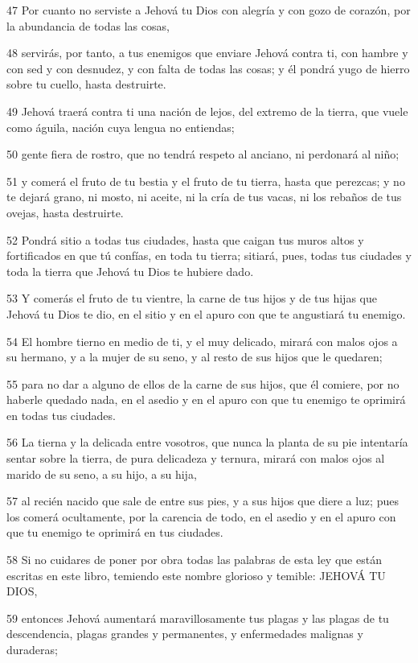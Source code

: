 \par 47 Por cuanto no serviste a Jehová tu Dios con alegría y con gozo de corazón, por la abundancia de todas las cosas,
\par 48 servirás, por tanto, a tus enemigos que enviare Jehová contra ti, con hambre y con sed y con desnudez, y con falta de todas las cosas; y él pondrá yugo de hierro sobre tu cuello, hasta destruirte.
\par 49 Jehová traerá contra ti una nación de lejos, del extremo de la tierra, que vuele como águila, nación cuya lengua no entiendas;
\par 50 gente fiera de rostro, que no tendrá respeto al anciano, ni perdonará al niño;
\par 51 y comerá el fruto de tu bestia y el fruto de tu tierra, hasta que perezcas; y no te dejará grano, ni mosto, ni aceite, ni la cría de tus vacas, ni los rebaños de tus ovejas, hasta destruirte.
\par 52 Pondrá sitio a todas tus ciudades, hasta que caigan tus muros altos y fortificados en que tú confías, en toda tu tierra; sitiará, pues, todas tus ciudades y toda la tierra que Jehová tu Dios te hubiere dado.
\par 53 Y comerás el fruto de tu vientre, la carne de tus hijos y de tus hijas que Jehová tu Dios te dio, en el sitio y en el apuro con que te angustiará tu enemigo.
\par 54 El hombre tierno en medio de ti, y el muy delicado, mirará con malos ojos a su hermano, y a la mujer de su seno, y al resto de sus hijos que le quedaren;
\par 55 para no dar a alguno de ellos de la carne de sus hijos, que él comiere, por no haberle quedado nada, en el asedio y en el apuro con que tu enemigo te oprimirá en todas tus ciudades.
\par 56 La tierna y la delicada entre vosotros, que nunca la planta de su pie intentaría sentar sobre la tierra, de pura delicadeza y ternura, mirará con malos ojos al marido de su seno, a su hijo, a su hija,
\par 57 al recién nacido que sale de entre sus pies, y a sus hijos que diere a luz; pues los comerá ocultamente, por la carencia de todo, en el asedio y en el apuro con que tu enemigo te oprimirá en tus ciudades.
\par 58 Si no cuidares de poner por obra todas las palabras de esta ley que están escritas en este libro, temiendo este nombre glorioso y temible: JEHOVÁ TU DIOS,
\par 59 entonces Jehová aumentará maravillosamente tus plagas y las plagas de tu descendencia, plagas grandes y permanentes, y enfermedades malignas y duraderas;
